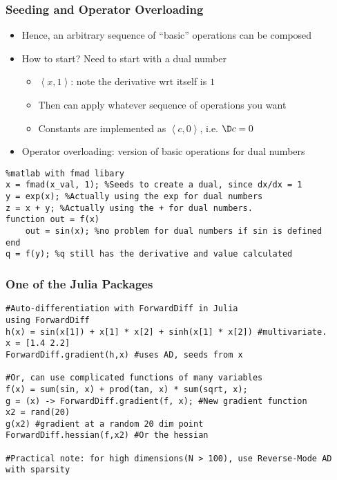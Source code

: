 \documentclass[nofootline]{etk-presentation}
\begin{document}
\begin{frame}[fragile]	\frametitle{Seeding and Operator Overloading}
	\begin{itemize}
		\item Hence, an arbitrary sequence of ``basic'' operations can be composed
		\item How to start?  Need to start with a dual number
		\begin{itemize}
			\item $\left<x,1\right>$: note the derivative wrt itself is $1$
			\smallskip
			\item Then can apply whatever sequence of operations you want
			\item Constants are implemented as $\left<c,0\right>$, i.e. $\D c = 0$
		\end{itemize}
		\item Operator overloading: version of basic operations for dual numbers
	\end{itemize}
\begin{verbatim}
%matlab with fmad libary
x = fmad(x_val, 1); %Seeds to create a dual, since dx/dx = 1
y = exp(x); %Actually using the exp for dual numbers
z = x + y; %Actually using the + for dual numbers.
function out = f(x)
	out = sin(x); %no problem for dual numbers if sin is defined
end
q = f(y); %q still has the derivative and value calculated
\end{verbatim}

\end{frame}

\begin{frame}[fragile]	\frametitle{One of the Julia Packages}
\begin{verbatim}
#Auto-differentiation with ForwardDiff in Julia
using ForwardDiff
h(x) = sin(x[1]) + x[1] * x[2] + sinh(x[1] * x[2]) #multivariate.
x = [1.4 2.2]
ForwardDiff.gradient(h,x) #uses AD, seeds from x

#Or, can use complicated functions of many variables
f(x) = sum(sin, x) + prod(tan, x) * sum(sqrt, x);
g = (x) -> ForwardDiff.gradient(f, x); #New gradient function
x2 = rand(20)
g(x2) #gradient at a random 20 dim point
ForwardDiff.hessian(f,x2) #Or the hessian

#Practical note: for high dimensions(N > 100), use Reverse-Mode AD with sparsity
\end{verbatim}
\end{frame}
		
\end{document}
